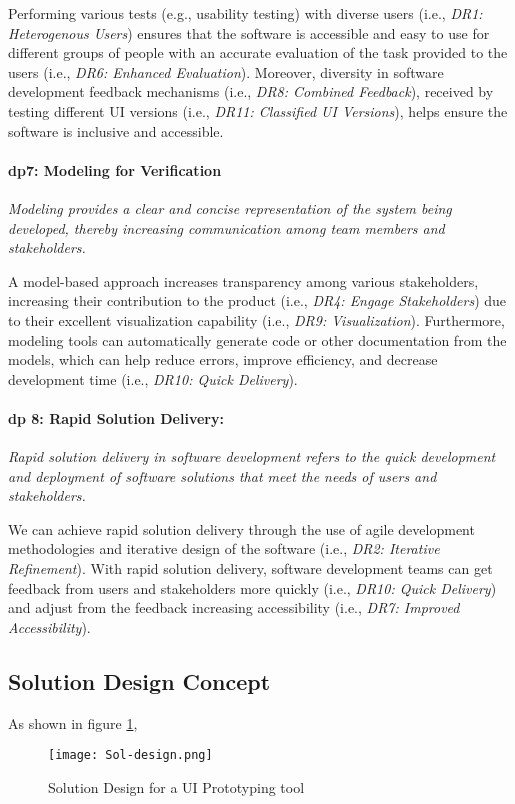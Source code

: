 Performing various tests (e.g., usability testing) with diverse users (i.e., \textit{DR1: Heterogenous Users}) ensures that the software is accessible and easy to use for different groups of people with an accurate evaluation of the task provided to the users (i.e., \textit{DR6: Enhanced Evaluation}).
Moreover, diversity in software development feedback mechanisms (i.e., \textit{DR8: Combined Feedback}), received by testing different UI versions (i.e., \textit{DR11: Classified UI Versions}), helps ensure the software is inclusive and accessible.

\paragraph{\ac{dp}7: Modeling for Verification} \textit{Modeling provides a clear and concise representation of the system being developed, thereby increasing communication among team members and stakeholders.}

A model-based approach increases transparency among various stakeholders, increasing their contribution to the product (i.e., \textit{DR4: Engage Stakeholders}) due to their excellent visualization capability (i.e., \textit{DR9: Visualization}).
Furthermore, modeling tools can automatically generate code or other documentation from the models, which can help reduce errors, improve efficiency, and decrease development time (i.e., \textit{DR10: Quick Delivery}).

\paragraph{\ac{dp} 8: Rapid Solution Delivery:} \textit{Rapid solution delivery in software development refers to the quick development and deployment of software solutions that meet the needs of users and stakeholders.}

We can achieve rapid solution delivery through the use of agile development methodologies and iterative design of the software (i.e., \textit{DR2: Iterative Refinement}).
With rapid solution delivery, software development teams can get feedback from users and stakeholders more quickly (i.e., \textit{DR10: Quick Delivery}) and adjust from the feedback increasing accessibility (i.e., \textit{DR7: Improved Accessibility}).

\subsection{Solution Design Concept}
\label{design:section:solutiondesign}
As shown in figure \ref{fig:design:solutiondesign},
\begin{figure}[htbp!]
  \centering    
  \texttt{[image: Sol-design.png]}
  \caption[Solution Design]{Solution Design for a UI Prototyping tool}
  \label{fig:design:solutiondesign}
\end{figure}

